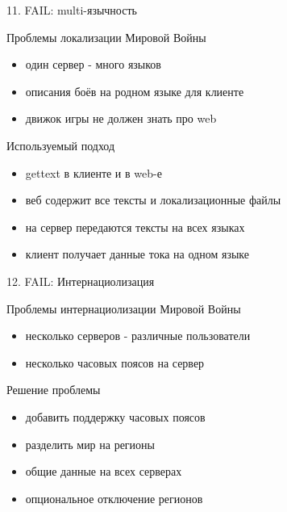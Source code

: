 \documentclass{beamer}
\begin{document}
\begin{frame}{11. FAIL: multi-язычность}
    \begin{block}{Проблемы локализации Мировой Войны}
        \begin{itemize}
            \item{один сервер - много языков}
            \item{описания боёв на родном языке для клиенте}
            \item{движок игры не должен знать про web}
        \end{itemize}
    \end{block}

    \pause
    \begin{block}{Используемый подход}
        \begin{itemize}
            \item{gettext в клиенте и в web-е}
            \item{веб содержит все тексты и локализационные файлы}
            \item{на сервер передаются тексты на всех языках}
            \item{клиент получает данные тока на одном языке}
        \end{itemize}
    \end{block}
\end{frame}


\begin{frame}{12. FAIL: Интернациолизация}
    \begin{block}{Проблемы интернациолизации Мировой Войны}
        \begin{itemize}
            \item{несколько серверов - различные пользователи}
            \item{несколько часовых поясов на сервер}
        \end{itemize}
    \end{block}

    \pause
    \begin{block}{Решение проблемы}
        \begin{itemize}
            \item{добавить поддержку часовых поясов}
            \item{разделить мир на регионы}
            \item{общие данные на всех серверах}
            \item{опциональное отключение регионов}
        \end{itemize}
    \end{block}
\end{frame}
\end{document}

